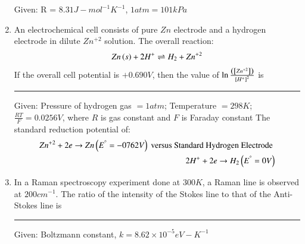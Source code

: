 \documentclass[journal]{IEEEtran}
\numberwithin{equation}{enumi}
\numberwithin{figure}{enumi}
\begin{document}
\begin{enumerate}
		Given: R = $8.31J-mol^{-1}K^{-1}$, $1 atm = 101 kPa$

		\hfill{}

	\item An electrochemical cell consists of pure $Zn$ electrode  and a hydrogen electrode  in dilute $Zn^{+2}$ solution. The overall reaction: 
		\begin{align*}
			Zn\left(s\right) + 2H^{+} \rightleftharpoons H_2 + Zn^{+2}
		\end{align*}
		If the overall cell potential is $+0.690 V$, then the value of $\ln{\frac{\ensuremath{\left({}\left[Zn^{+2}\right]\right)}}{\ensuremath{{}\left[H^{+}\right]}^2}}$ is \rule{1cm}{0.1pt} 
		Given: Pressure of hydrogen gas $= 1 atm$; Temperature $= 298K$;
		$\frac{RT}{F} = 0.0256 V$, where $R$ is gas constant and $F$ is Faraday constant
		The standard reduction potential of: 
		\begin{align*}
			Zn^{+2} + 2e \rightarrow Zn \left(E^{\degree} = -0762 V\right) \text{ versus Standard Hydrogen Electrode } \\
			2H^{+} + 2e \rightarrow H_2 \left(E^{\degree} = 0 V\right)
		\end{align*}

		\hfill{}

	\item In a Raman spectroscopy experiment done at $300K$, a Raman line is observed at $200cm^{-1}$. The ratio of the intensity of the Stokes line to that of the Anti-Stokes line is \rule{1cm}{0.1pt} 

		Given: Boltzmann constant, $k = 8.62 \times 10^{-5} eV-K^{-1}$
		\hfill{}
\end{enumerate}
\end{document}
